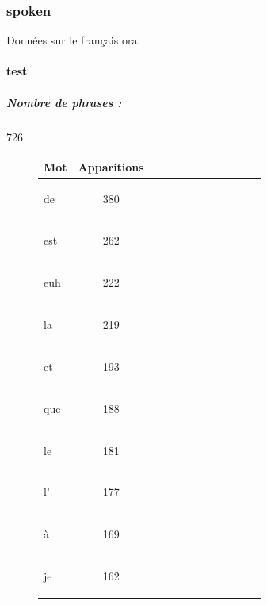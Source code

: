 \subsubsection{spoken } 
 Données sur le français oral

 \paragraph{test } 
\subparagraph{Nombre de phrases :} 726\\ 
\begin{figure}[H] \begin{minipage}{0.48\textwidth} \centering \begin{tabular}{|l || *{11 }{|c} |} \hline
Mot & Apparitions  \\ \hline
\begin{verb} de \end{verb} &380\\ \hline
\begin{verb} est \end{verb} &262\\ \hline
\begin{verb} euh \end{verb} &222\\ \hline
\begin{verb} la \end{verb} &219\\ \hline
\begin{verb} et \end{verb} &193\\ \hline
\begin{verb} que \end{verb} &188\\ \hline
\begin{verb} le \end{verb} &181\\ \hline
\begin{verb} l' \end{verb} &177\\ \hline
\begin{verb} à \end{verb} &169\\ \hline
\begin{verb} je \end{verb} &162\\ \hline


\end{tabular}
\end{minipage}
\end{figure}
